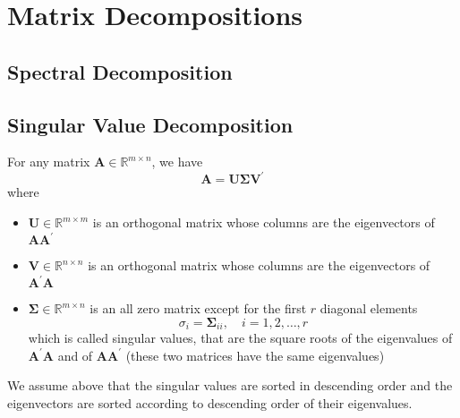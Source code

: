 \chapter{Matrix Decompositions}

\section{Spectral Decomposition}

\section{Singular Value Decomposition}

\begin{proposition}
    For any matrix $\mathbf{A}\in\mathbb{R}^{m\times n}$, we have
    \begin{equation}
        \mathbf{A}=\mathbf{U}\boldsymbol{\Sigma}\mathbf{V}^{\prime}
    \end{equation}
    where
    \begin{itemize}
        \item $\mathbf{U}\in\mathbb{R}^{m\times m}$ is an orthogonal matrix whose columns are the eigenvectors of $\mathbf{A}\mathbf{A}^{\prime}$
        \item $\mathbf{V}\in\mathbb{R}^{n\times n}$ is an orthogonal matrix whose columns are the eigenvectors of $\mathbf{A}^{\prime}\mathbf{A}$
        \item $\boldsymbol{\Sigma}\in\mathbb{R}^{m\times n}$ is an all zero matrix except for the first $r$ diagonal elements
              \begin{equation*}
                  \sigma_{i}=\boldsymbol{\Sigma}_{ii},\quad i=1,2,\ldots,r
              \end{equation*}
              which is called singular values, that are the square roots of the eigenvalues of $\mathbf{A}^{\prime}\mathbf{A}$ and of $\mathbf{A}\mathbf{A}^{\prime}$ (these two matrices have the same eigenvalues)
    \end{itemize}
\end{proposition}

\begin{remark}
    We assume above that the singular values are sorted in descending order and the eigenvectors are sorted according to descending order of their eigenvalues.
\end{remark}

